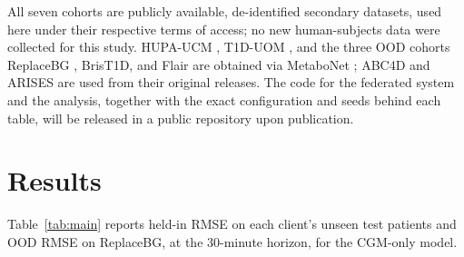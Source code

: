 \documentclass[10pt,letterpaper]{article}
\begin{document}
All seven cohorts are publicly available, de-identified secondary datasets, used
here under their respective terms of access; no new human-subjects data were
collected for this study. HUPA-UCM \cite{hidalgo2024hupaucm}, T1D-UOM
\cite{alsuhaymi2025t1duom}, and the three OOD cohorts ReplaceBG
\cite{aleppo2017replacebg}, BrisT1D, and Flair are obtained via MetaboNet
\cite{wolff2026metabonet}; ABC4D and ARISES are used from their original releases. The code for the federated system and the analysis, together
with the exact configuration and seeds behind each table, will be released in a
public repository upon publication.

\section*{Results}

Table~\ref{tab:main} reports held-in RMSE on each client's unseen test patients
and OOD RMSE on ReplaceBG, at the 30-minute horizon, for the CGM-only model.
\end{document}
